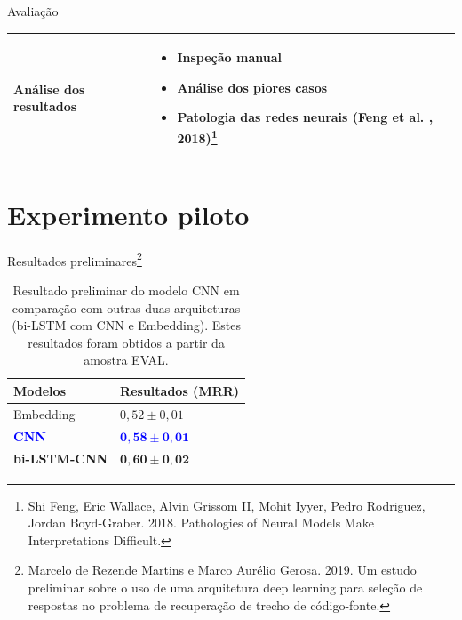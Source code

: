 \documentclass[10pt]{beamer}
\begin{document}
\begin{frame}{Avaliação}
   \begin{center}
       \begin{tabular}{|p{4cm}|p{4cm}|}
       
            \hline
            Análise dos resultados & \begin{itemize}
                \item Inspeção manual
                \item Análise dos piores casos
                \item Patologia das redes neurais (Feng et al. , 2018)\footnote{Shi Feng, Eric Wallace, Alvin Grissom II, Mohit Iyyer, Pedro Rodriguez, Jordan Boyd-Graber. 2018. Pathologies of Neural Models Make Interpretations Difficult.}
            \end{itemize} \\
            \hline
       \end{tabular}
   \end{center}
\end{frame}

\section{Experimento piloto}


\begin{frame}{Resultados preliminares\footnote{Marcelo de Rezende Martins e Marco Aurélio Gerosa. 2019. Um estudo preliminar sobre o uso de uma arquitetura deep learning para seleção de respostas no problema de recuperação de trecho de código-fonte.}}
  \begin{table}[h]
\centering
\begin{tabular}{ p{3cm} p{3cm} }
 \hline
 \textbf{Modelos} & \textbf{Resultados (MRR)}\\
 \hline
 Embedding & $0,52 \pm 0,01$\\
 
 \textcolor{blue}{\textbf{CNN}} & \textcolor{blue}{$\bm{0,58} \pm \bm{0,01}$} \\
 
 \textbf{bi-LSTM-CNN} & $\bm{0,60} \pm \bm{0,02}$\\
 \hline
\end{tabular}
\caption[Resultado preliminar]{Resultado preliminar do modelo CNN em comparação com outras duas arquiteturas (bi-LSTM com CNN e Embedding). Estes resultados foram obtidos a partir da amostra EVAL.}
\end{table}
\end{frame}
\end{document}
